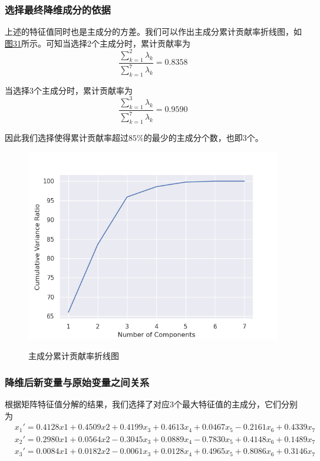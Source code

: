 \documentclass[UTF8]{ctexart}
\begin{document}
	\subsubsection{选择最终降维成分的依据} 上述的特征值同时也是主成分的方差。我们可以作出主成分累计贡献率折线图，如\hyperref[Fig.31]{图31}所示。可知当选择2个主成分时，累计贡献率为
	\begin{equation*}
	\frac{\sum\limits_{k=1}^{2} \lambda_k}{\sum\limits_{k=1}^{7} \lambda_k} = 0.8358
	\end{equation*}
	
	当选择3个主成分时，累计贡献率为
	\begin{equation*}
	\frac{\sum\limits_{k=1}^{3} \lambda_k}{\sum\limits_{k=1}^{7} \lambda_k} = 0.9590
	\end{equation*}
	
	因此我们选择使得累计贡献率超过$85\%$的最少的主成分个数，也即$3$个。
	
	
	\begin{figure}[htbp]
		\centering
		\caption{主成分累计贡献率折线图}
		\includegraphics[width=1.0\textwidth]{pca_variance.png}
		\label{Fig.31}
	\end{figure}
	
	\subsubsection{降维后新变量与原始变量之间关系} 
	
	根据矩阵特征值分解的结果，我们选择了对应3个最大特征值的主成分，它们分别为
	\begin{align*}
	& x_1'=  0.4128x1 +  0.4509x2 + 0.4199x_3 + 0.4613x_4 + 0.0467x_5 - 0.2161x_6 + 0.4339x_7 \\
	& x_2' = 0.2980x1 +  0.0564x2 - 0.3045x_3 + 0.0889x_4 - 0.7830x_5 + 0.4148x_6 + 0.1489x_7 \\
	& x_3' = 0.0084x1 +  0.0182x2 - 0.0061x_3 + 0.0128x_4 + 0.4965x_5 + 0.8086x_6 + 0.3146x_7
	\end{align*}
	
\end{document}
